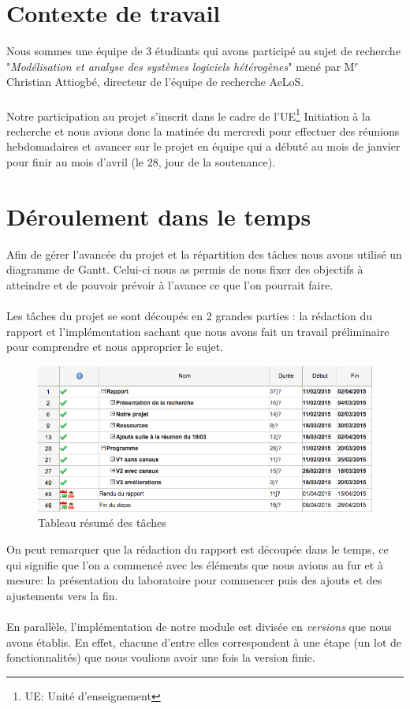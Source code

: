 \documentclass[12pt,a4paper]{report}
\begin{document}
\section{Contexte de travail}
Nous sommes une équipe de 3 étudiants qui avons participé
 au sujet de recherche 
"\emph{Modélisation et analyse des systèmes logiciels hétérogènes}" mené par 
M$^r$ Christian Attiogbé, directeur de l'équipe de recherche AeLoS.
\\\\
Notre participation au projet s'inscrit dans 
le cadre de l'UE\footnote{UE: Unité d'enseignement} Initiation à 
la recherche et nous avions donc la matinée du mercredi pour effectuer
des réunions hebdomadaires et avancer sur le projet en équipe qui 
a débuté au mois de janvier pour finir au mois d'avril (le 28, jour de la soutenance).

\section{Déroulement dans le temps}
Afin de gérer l'avancée du projet et la répartition des tâches nous avons utilisé
un diagramme de Gantt. Celui-ci nous as permis de nous fixer des objectifs à atteindre
et de pouvoir prévoir à l'avance ce que l'on pourrait faire.
\\\\
Les tâches du projet se sont découpés en 2 grandes parties : la rédaction du rapport
et l'implémentation sachant que nous avons fait un travail préliminaire pour
comprendre et nous approprier le sujet.

\begin{figure}[H]
  \centering
  \includegraphics[scale=0.6]{ressources/taches.png}
  \caption{Tableau résumé des tâches}
\end{figure}

On peut remarquer que la rédaction du rapport est découpée dans le temps, ce qui 
signifie que l'on a commencé avec les éléments que nous avions au fur et à mesure: 
la présentation du laboratoire pour commencer puis des ajouts et des ajustements vers la fin.
\\\\
En parallèle, l'implémentation de notre module est divisée en \emph{versions} que nous
avons établis. En effet, chacune d'entre elles correspondent à une étape (un lot de fonctionnalités)
que nous voulions avoir une fois la version finie.
\end{document}
